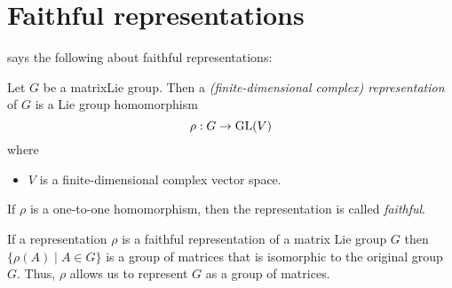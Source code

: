\section{Faithful representations} \label{sec:faithRepre}
\cite[Def.4.1]{hall2003lie} says the following about faithful representations:
\begin{defn}
  \begin{comment}
    See:
    \begin{itemize}
      \item \cite[Def.4.1]{hall2003lie}
      \item \url{http://nlab.mathforge.org/nlab/show/faithful+representation}
    \end{itemize}
  \end{comment}
  Let $G$ be a matrix\TODO[??] Lie group. Then a \emph{(finite-dimensional
  complex) representation} of $G$ is a Lie group homomorphism
  \[
    \rho:G\to\operatorname{GL}(V)
  \]
  where
  \begin{itemize}
    \item $V$ is a finite-dimensional complex vector space.
  \end{itemize}
  If $\rho$ is a one-to-one homomorphism, then the representation is called
  \emph{faithful}.
  \begin{comment}
    \textbf{Other criterion:}
    If the associated homomorphism $G\to\Aut(V)$ is injective, then the
    representation is \emph{faithful}.
  \end{comment}
  \begin{s-rem}
    If a representation $\rho$ is a faithful representation of a matrix Lie
    group $G$ then $\{\rho(A)\mid A\in G\}$ is a group of matrices that is
    isomorphic to the original group $G$. Thus, $\rho$ allows us to represent
    $G$ as a group of matrices.
  \end{s-rem}
\end{defn}
